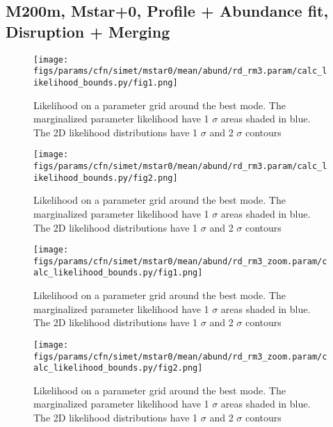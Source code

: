 \documentclass[twocolumn]{article}
\begin{document}
\subsection{M200m, Mstar+0, Profile + Abundance fit, Disruption + Merging}
\begin{figure}[H]
  \center\texttt{[image: figs/params/cfn/simet/mstar0/mean/abund/rd\_rm3.param/calc\_likelihood\_bounds.py/fig1.png]}
  \caption{Likelihood on a parameter grid around the best mode. The marginalized parameter likelihood have
    1 $\sigma$ areas shaded in blue. The 2D likelihood distributions have 1 $\sigma$  and 2 $\sigma$ contours}
  \label{fig:basic_rd:likelihood}
\end{figure}

\begin{figure}[H]
  \center\texttt{[image: figs/params/cfn/simet/mstar0/mean/abund/rd\_rm3.param/calc\_likelihood\_bounds.py/fig2.png]}
  \caption{Likelihood on a parameter grid around the best mode. The marginalized parameter likelihood have
    1 $\sigma$ areas shaded in blue. The 2D likelihood distributions have 1 $\sigma$  and 2 $\sigma$ contours}
  \label{fig:basic_rd:likelihood}
\end{figure}

\begin{figure}[H]
  \center\texttt{[image: figs/params/cfn/simet/mstar0/mean/abund/rd\_rm3\_zoom.param/calc\_likelihood\_bounds.py/fig1.png]}
  \caption{Likelihood on a parameter grid around the best mode. The marginalized parameter likelihood have
    1 $\sigma$ areas shaded in blue. The 2D likelihood distributions have 1 $\sigma$  and 2 $\sigma$ contours}
  \label{fig:basic_rd:likelihood}
\end{figure}

\begin{figure}[H]
  \center\texttt{[image: figs/params/cfn/simet/mstar0/mean/abund/rd\_rm3\_zoom.param/calc\_likelihood\_bounds.py/fig2.png]}
  \caption{Likelihood on a parameter grid around the best mode. The marginalized parameter likelihood have
    1 $\sigma$ areas shaded in blue. The 2D likelihood distributions have 1 $\sigma$  and 2 $\sigma$ contours}
  \label{fig:basic_rd:likelihood}
\end{figure}
\end{document}
